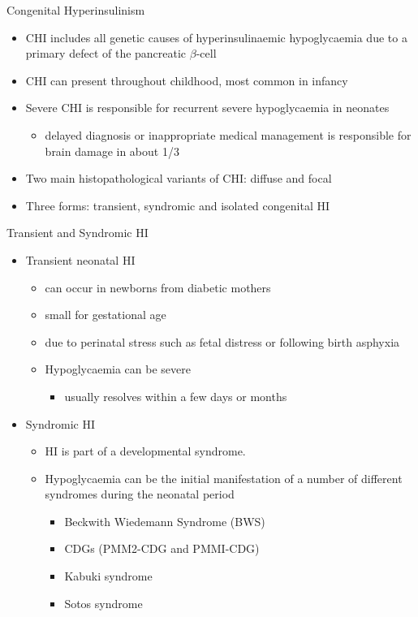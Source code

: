 \documentclass[presentation, smaller]{beamer}
\begin{document}
\begin{frame}[label={sec:org7f2ee67}]{Congenital Hyperinsulinism}
\begin{itemize}
\item CHI includes all genetic causes of hyperinsulinaemic
hypoglycaemia due to a primary defect of the pancreatic
\(\beta\)-cell
\item CHI can present throughout childhood, most common in infancy
\item Severe CHI is responsible for recurrent severe hypoglycaemia in neonates
\begin{itemize}
\item delayed diagnosis or inappropriate medical management is responsible for brain damage in about 1/3
\end{itemize}
\item Two main histopathological variants of CHI: diffuse and focal
\item Three forms: transient, syndromic and isolated congenital HI
\end{itemize}
\end{frame}

\begin{frame}[label={sec:org0651780}]{Transient and Syndromic HI}
\begin{itemize}
\item Transient neonatal HI
\begin{itemize}
\item can occur in newborns from diabetic mothers
\item small for gestational age
\item due to perinatal stress such as fetal distress or following birth asphyxia
\item Hypoglycaemia can be severe
\begin{itemize}
\item usually resolves within a few days or months
\end{itemize}
\end{itemize}
\item Syndromic HI
\begin{itemize}
\item HI is part of a developmental syndrome.
\item Hypoglycaemia can be the initial manifestation of a number of
different syndromes during the neonatal period
\begin{itemize}
\item Beckwith Wiedemann Syndrome (BWS)
\item CDGs (PMM2-CDG and PMMI-CDG)
\item Kabuki syndrome
\item Sotos syndrome
\end{itemize}
\end{itemize}
\end{itemize}
\end{frame}
\end{document}
